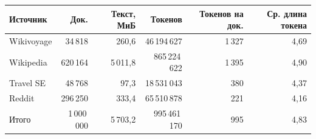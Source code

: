 \begin{tabular}{|l|r|r|r|r|r|}
\hline
Источник & Док. & Текст, МиБ & Токенов & Токенов на док. & Ср. длина токена \\
\hline
Wikivoyage & 34\,818 & 260,6 & 46\,194\,627 & 1\,327 & 4,69 \\
\hline
Wikipedia & 620\,164 & 5\,011,8 & 865\,224\,622 & 1\,395 & 4,90 \\
\hline
Travel SE & 48\,768 & 97,3 & 18\,531\,043 & 380 & 4,37 \\
\hline
Reddit & 296\,250 & 333,4 & 65\,510\,878 & 221 & 4,16 \\
\hline
Итого & 1\,000\,000 & 5\,703,2 & 995\,461\,170 & 995 & 4,83 \\
\hline
\end{tabular}

